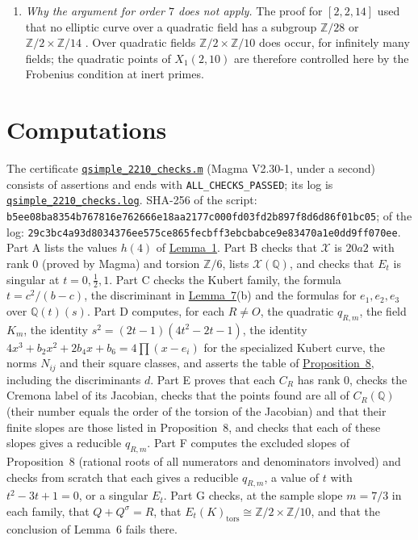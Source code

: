 \documentclass[11pt]{article}
\newcommand{\Q}{\mathbb Q}
\newcommand{\Z}{\mathbb Z}
\begin{document}
\begin{enumerate}
\item \emph{Why the argument for order \(7\) does not apply.} The proof for \([2,2,14]\) used
that no elliptic curve over a quadratic field has a subgroup \(\Z/28\) or \(\Z/2\times\Z/14\)
\cite[Lemma~1]{P2214}. Over quadratic
fields \(\Z/2\times\Z/10\) does occur, for infinitely many fields; the quadratic points of
\(X_1(2,10)\) are therefore controlled here by the Frobenius condition at inert primes.
\end{enumerate}

\section{Computations}\label{computations}

The certificate
\href{https://genus-2-torsion.github.io/data/knowledge/sources/qsimple_2210_checks.m}{\texttt{qsimple\_2210\_checks.m}}
(Magma V2.30-1, under a second) consists of assertions and ends with \texttt{ALL\_CHECKS\_PASSED};
its log is
\href{https://genus-2-torsion.github.io/data/knowledge/sources/qsimple_2210_checks.log}{\texttt{qsimple\_2210\_checks.log}}.
SHA-256 of the script:
\texttt{b5ee08ba8354b767\allowbreak 816e762666e18aa2\allowbreak 177c000fd03fd2b8\allowbreak 97f8d6d86f01bc05}; of the log:
\texttt{29c3bc4a93d80343\allowbreak 76ee575ce865fecb\allowbreak ff3ebcbabce9e834\allowbreak 70a1e0dd9ff070ee}. Part A lists the values
\(h(4)\) of \hyperref[lemma-f3]{Lemma~1}. Part B checks that \(\mathcal X\) is \(20a2\) with rank
\(0\) (proved by Magma) and torsion \(\Z/6\), lists \(\mathcal X(\Q)\), and checks that \(E_t\) is
singular at \(t=0,\tfrac12,1\). Part C checks the Kubert family, the formula \(t=c^2/(b-c)\), the
discriminant in \hyperref[lemma-x110]{Lemma~7}(b) and the formulas for \(e_1,e_2,e_3\) over
\(\Q(t)(s)\). Part D computes, for each \(R\neq O\), the quadratic \(q_{R,m}\), the field
\(K_m\), the identity \(s^2=(2t-1)(4t^2-2t-1)\), the identity
\(4x^3+b_2x^2+2b_4x+b_6=4\prod(x-e_i)\) for the specialized Kubert curve, the norms \(N_{ij}\) and
their square classes, and asserts the table of \hyperref[prop-families]{Proposition~8},
including the discriminants \(d\). Part E proves that each \(C_R\) has rank \(0\), checks the
Cremona label of its Jacobian, checks that the points found are all of \(C_R(\Q)\) (their number
equals the order of the torsion of the Jacobian) and that their finite slopes are those listed in
Proposition~8, and checks that each of these slopes gives a reducible \(q_{R,m}\). Part F computes the excluded slopes of Proposition~8 (rational roots of all
numerators and denominators involved) and checks from scratch that each gives a reducible
\(q_{R,m}\), a value of \(t\) with \(t^2-3t+1=0\), or a singular \(E_t\). Part G checks, at the
sample slope \(m=7/3\) in each family, that \(Q+Q^\sigma=R\), that \(E_t(K)_{\mathrm{tors}}\cong
\Z/2\times\Z/10\), and that the conclusion of Lemma~6 fails there.
\end{document}
